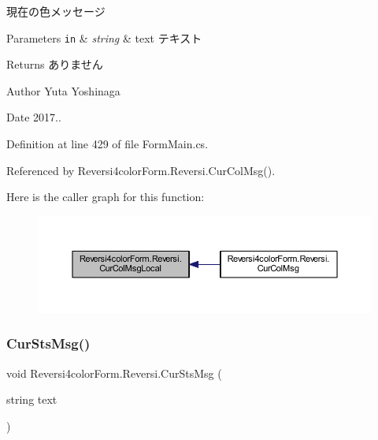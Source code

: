 現在の色メッセージ 


\begin{DoxyParams}[1]{Parameters}
\mbox{\tt in}  & {\em string} & text テキスト \\
\hline
\end{DoxyParams}
\begin{DoxyReturn}{Returns}
ありません 
\end{DoxyReturn}
\begin{DoxyAuthor}{Author}
Yuta Yoshinaga 
\end{DoxyAuthor}
\begin{DoxyDate}{Date}
2017.. 
\end{DoxyDate}


Definition at line 429 of file Form\+Main.\+cs.



Referenced by Reversi4color\+Form.\+Reversi.\+Cur\+Col\+Msg().

Here is the caller graph for this function\+:
\nopagebreak
\begin{figure}[H]
\begin{center}
\leavevmode
\includegraphics[width=350pt]{class_reversi4color_form_1_1_reversi_a6ab2074a5474736e76644cf45c08827b_icgraph}
\end{center}
\end{figure}
\mbox{\label{class_reversi4color_form_1_1_reversi_af82882188f72f849b21890fe21199083}} 
\subsubsection{\texorpdfstring{Cur\+Sts\+Msg()}{CurStsMsg()}}
{\footnotesize\ttfamily void Reversi4color\+Form.\+Reversi.\+Cur\+Sts\+Msg (\begin{DoxyParamCaption}\item[{string}]{text }\end{DoxyParamCaption})}



